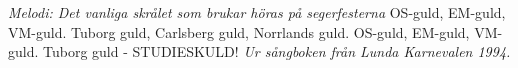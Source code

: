 {\footnotesize\textit{Melodi: Det vanliga skrålet som brukar höras på segerfesterna}}
\vspace{10pt}
OS-guld, EM-guld, VM-guld.
Tuborg guld, Carlsberg guld, Norrlands guld.
OS-guld, EM-guld, VM-guld.
Tuborg guld - STUDIESKULD!
\vspace{10pt}
{\footnotesize\textit{Ur sångboken från Lunda Karnevalen 1994.}}
